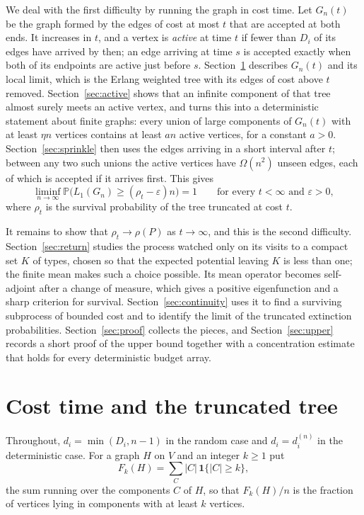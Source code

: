 \documentclass[11pt]{amsart}
\theoremstyle{remark}
\numberwithin{equation}{section}
\newcommand{\Pp}{\mathbb P}
\newcommand{\1}{\mathbf 1}
\begin{document}
We deal with the first difficulty by running the graph in cost time. Let $G_n(t)$ be the graph formed by the edges of cost at most $t$ that are accepted at both ends. It increases in $t$, and a vertex is \emph{active} at time $t$ if fewer than $D_i$ of its edges have arrived by then; an edge arriving at time $s$ is accepted exactly when both of its endpoints are active just before $s$. Section~\ref{sec:time} describes $G_n(t)$ and its local limit, which is the Erlang weighted tree with its edges of cost above $t$ removed. Section~\ref{sec:active} shows that an infinite component of that tree almost surely meets an active vertex, and turns this into a deterministic statement about finite graphs: every union of large components of $G_n(t)$ with at least $\eta n$ vertices contains at least $an$ active vertices, for a constant $a>0$. Section~\ref{sec:sprinkle} then uses the edges arriving in a short interval after $t$; between any two such unions the active vertices have $\Omega(n^2)$ unseen edges, each of which is accepted if it arrives first. This gives
\[
\liminf_{n\to\infty}\Pp\bigl(L_1(G_n)\ge(\rho_t-\varepsilon)n\bigr)=1
\qquad\text{for every }t<\infty\text{ and }\varepsilon>0,
\]
where $\rho_t$ is the survival probability of the tree truncated at cost $t$.

It remains to show that $\rho_t\to\rho(P)$ as $t\to\infty$, and this is the second difficulty. Section~\ref{sec:return} studies the process watched only on its visits to a compact set $K$ of types, chosen so that the expected potential leaving $K$ is less than one; the finite mean makes such a choice possible. Its mean operator becomes self-adjoint after a change of measure, which gives a positive eigenfunction and a sharp criterion for survival. Section~\ref{sec:continuity} uses it to find a surviving subprocess of bounded cost and to identify the limit of the truncated extinction probabilities. Section~\ref{sec:proof} collects the pieces, and Section~\ref{sec:upper} records a short proof of the upper bound together with a concentration estimate that holds for every deterministic budget array.

\section{Cost time and the truncated tree}\label{sec:time}

Throughout, $d_i=\min(D_i,n-1)$ in the random case and $d_i=d_i^{(n)}$ in the deterministic case. For a graph $H$ on $V$ and an integer $k\ge1$ put
\[
F_k(H)=\sum_{C}|C|\,\1\{|C|\ge k\},
\]
the sum running over the components $C$ of $H$, so that $F_k(H)/n$ is the fraction of vertices lying in components with at least $k$ vertices.
\end{document}
